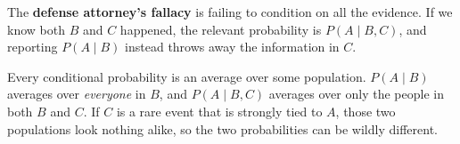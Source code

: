 \begin{definition}\label{def:defense}
The \textbf{defense attorney's fallacy} is failing to condition on all the evidence. If we know both $B$ and $C$ happened, the relevant probability is $P(A \mid B, C)$, and reporting $P(A \mid B)$ instead throws away the information in $C$.
\end{definition}

\begin{intuition}
Every conditional probability is an average over some population. $P(A \mid B)$ averages over \emph{everyone} in $B$, and $P(A \mid B, C)$ averages over only the people in both $B$ and $C$. If $C$ is a rare event that is strongly tied to $A$, those two populations look nothing alike, so the two probabilities can be wildly different.
\end{intuition}

